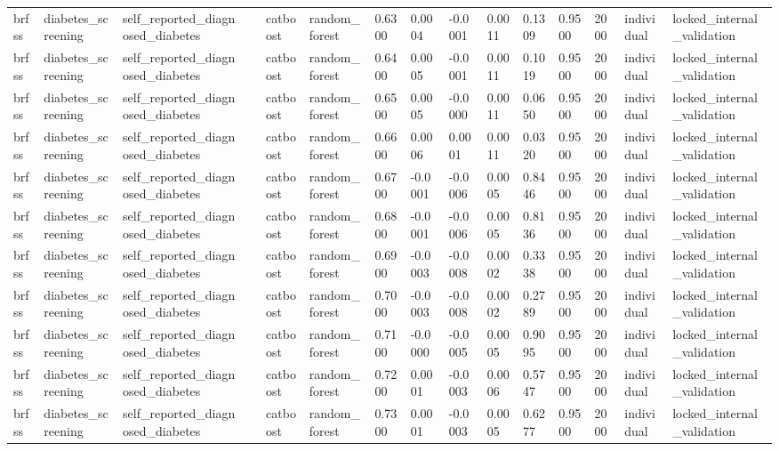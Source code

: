 \begin{tabular}{lllllllllllllll}
brfss & diabetes\_screening & self\_reported\_diagnosed\_diabetes &  & catboost & random\_forest & 0.6300 & 0.0004 & -0.0001 & 0.0011 & 0.1309 & 0.9500 & 2000 & individual & locked\_internal\_validation \\
brfss & diabetes\_screening & self\_reported\_diagnosed\_diabetes &  & catboost & random\_forest & 0.6400 & 0.0005 & -0.0001 & 0.0011 & 0.1019 & 0.9500 & 2000 & individual & locked\_internal\_validation \\
brfss & diabetes\_screening & self\_reported\_diagnosed\_diabetes &  & catboost & random\_forest & 0.6500 & 0.0005 & -0.0000 & 0.0011 & 0.0650 & 0.9500 & 2000 & individual & locked\_internal\_validation \\
brfss & diabetes\_screening & self\_reported\_diagnosed\_diabetes &  & catboost & random\_forest & 0.6600 & 0.0006 & 0.0001 & 0.0011 & 0.0320 & 0.9500 & 2000 & individual & locked\_internal\_validation \\
brfss & diabetes\_screening & self\_reported\_diagnosed\_diabetes &  & catboost & random\_forest & 0.6700 & -0.0001 & -0.0006 & 0.0005 & 0.8446 & 0.9500 & 2000 & individual & locked\_internal\_validation \\
brfss & diabetes\_screening & self\_reported\_diagnosed\_diabetes &  & catboost & random\_forest & 0.6800 & -0.0001 & -0.0006 & 0.0005 & 0.8136 & 0.9500 & 2000 & individual & locked\_internal\_validation \\
brfss & diabetes\_screening & self\_reported\_diagnosed\_diabetes &  & catboost & random\_forest & 0.6900 & -0.0003 & -0.0008 & 0.0002 & 0.3338 & 0.9500 & 2000 & individual & locked\_internal\_validation \\
brfss & diabetes\_screening & self\_reported\_diagnosed\_diabetes &  & catboost & random\_forest & 0.7000 & -0.0003 & -0.0008 & 0.0002 & 0.2789 & 0.9500 & 2000 & individual & locked\_internal\_validation \\
brfss & diabetes\_screening & self\_reported\_diagnosed\_diabetes &  & catboost & random\_forest & 0.7100 & -0.0000 & -0.0005 & 0.0005 & 0.9095 & 0.9500 & 2000 & individual & locked\_internal\_validation \\
brfss & diabetes\_screening & self\_reported\_diagnosed\_diabetes &  & catboost & random\_forest & 0.7200 & 0.0001 & -0.0003 & 0.0006 & 0.5747 & 0.9500 & 2000 & individual & locked\_internal\_validation \\
brfss & diabetes\_screening & self\_reported\_diagnosed\_diabetes &  & catboost & random\_forest & 0.7300 & 0.0001 & -0.0003 & 0.0005 & 0.6277 & 0.9500 & 2000 & individual & locked\_internal\_validation \\

\end{tabular}

